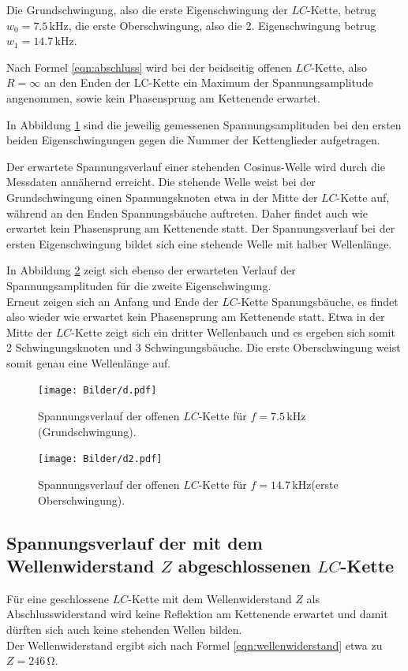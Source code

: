 Die Grundschwingung, also die erste Eigenschwingung der $LC$-Kette, betrug $w_{\mathrm{0}}=7.5 \,\si{\kilo\Hz}$, die erste Oberschwingung, also die 2. Eigenschwingung betrug $w_{\mathrm{1}}=14.7 \,\si{\kilo\Hz}$.

Nach Formel  \eqref{eqn:abschluss} wird bei der beidseitig offenen $LC$-Kette, also $R=\infty$ an den Enden der LC-Kette ein Maximum der Spannungsamplitude angenommen, sowie kein Phasensprung am Kettenende erwartet.

In Abbildung \ref{fig:plotdeins} sind die jeweilig gemessenen Spannungsamplituden bei den ersten beiden Eigenschwingungen gegen die Nummer der Kettenglieder aufgetragen.

Der erwartete Spannungsverlauf einer stehenden Cosinus-Welle wird durch die Messdaten annähernd erreicht. Die stehende Welle weist bei der Grundschwingung einen Spannungsknoten etwa in der Mitte der $LC$-Kette auf, während an den Enden Spannungsbäuche auftreten.
Daher findet auch wie erwartet kein Phasensprung am Kettenende statt.
Der Spannungsverlauf bei der ersten Eigenschwingung bildet sich eine stehende Welle mit halber Wellenlänge.

In Abbildung \ref{fig:plotd} zeigt sich ebenso der erwarteten Verlauf der Spannungsamplituden für die zweite Eigenschwingung.\\
Erneut zeigen sich an Anfang und Ende der $LC$-Kette Spanungsbäuche, es findet also wieder wie erwartet kein Phasensprung am Kettenende statt.
Etwa in der Mitte der $LC$-Kette zeigt sich ein dritter Wellenbauch und es ergeben sich somit 2 Schwingungsknoten und 3 Schwingungsbäuche.
Die erste Oberschwingung weist somit genau eine Wellenlänge auf.
\begin{figure}
	\centering
	\texttt{[image: Bilder/d.pdf]}
	\caption{Spannungsverlauf der offenen $LC$-Kette für $f=7.5 \,\si{\kilo\Hz}$(Grundschwingung).}
	\label{fig:plotdeins}
\end{figure}

\begin{figure}
	\centering
	\texttt{[image: Bilder/d2.pdf]}
	\caption{Spannungsverlauf der offenen $LC$-Kette für $f=14.7 \,\si{\kilo\Hz}$(erste Oberschwingung).}
	\label{fig:plotd}
\end{figure}
\FloatBarrier
\subsection{Spannungsverlauf der mit dem Wellenwiderstand $Z$ abgeschlossenen $LC$-Kette}
Für eine geschlossene $LC$-Kette mit dem Wellenwiderstand $Z$ als Abschlusswiderstand wird keine Reflektion am Kettenende erwartet und damit dürften sich auch keine stehenden Wellen bilden.\\
Der Wellenwiderstand ergibt sich nach Formel \eqref{eqn:wellenwiderstand} etwa zu $Z=246 \,\si{\ohm}$.\\

